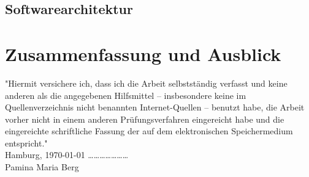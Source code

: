 \documentclass[paper=a4, pagesize, DIV=calc, BCOR=12.5mm, twoside=on, onecolumn=on, open = any, titlepage =on, parskip =half-, headsepline = on, footsepline = on, chapterprefix = on, appendixprefix = off, fontsize = 12pt, numbers = noenddot, abstract = on]{scrbook}
\numberwithin{equation}{chapter}
\theoremstyle{definition}
\theoremstyle{plain}
\theoremstyle{plain}
\theoremstyle{remark}
\theoremstyle{plain}
\theoremstyle{plain}
\begin{document}
\section{Softwarearchitektur}

\newpage
\chapter{Zusammenfassung und Ausblick}

\newpage

\newpage
\thispagestyle{empty}
\vspace*{\fill}
"Hiermit versichere ich, dass ich die Arbeit selbstständig verfasst und keine anderen als die angegebenen Hilfsmittel – insbesondere keine im Quellenverzeichnis nicht benannten Internet-Quellen – benutzt habe, die Arbeit vorher nicht in einem anderen Prüfungsverfahren eingereicht habe und die eingereichte schriftliche Fassung der auf dem elektronischen Speichermedium entspricht."\\

Hamburg, \today \hspace*{\fill} \dots \dots \dots \dots \dots \dots \dots\\
\hspace*{\fill} Pamina Maria Berg $\,$
\end{document}
